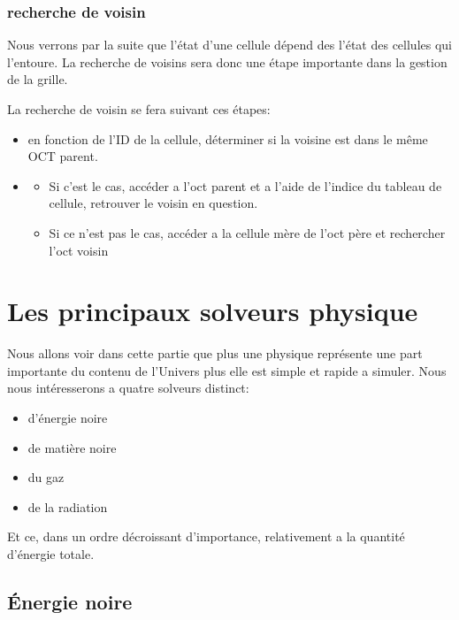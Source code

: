 \subsection{recherche de voisin}
Nous verrons par la suite que l'état d'une cellule dépend des l'état des cellules qui l'entoure.
La recherche de voisins sera donc une étape importante dans la gestion de la grille.

La recherche de voisin se fera suivant ces étapes:

\begin{itemize}
\item en fonction de l'ID de la cellule, déterminer si la voisine est dans le même OCT parent.


\item
\begin{itemize}
\item Si c'est le cas, accéder a l'oct parent et a l'aide de l'indice du tableau de cellule, retrouver le voisin en question.
\item Si ce n'est pas le cas, accéder a la cellule mère de l'oct père et rechercher l'oct voisin
\end{itemize}

\end{itemize}

\chapter{Les principaux solveurs physique}

Nous allons voir dans cette partie que plus une physique représente une part importante du contenu de l'Univers plus elle est simple et rapide a simuler.
Nous nous intéresserons a quatre solveurs distinct:
\begin{itemize}
\item d'énergie noire
\item de matière noire
\item du gaz
\item de la radiation
\end{itemize}
Et ce, dans un ordre décroissant d'importance, relativement a la quantité d'énergie totale.


\section{Énergie noire}

